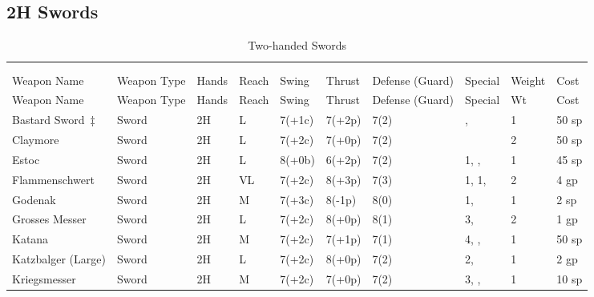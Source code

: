\documentclass[oneside,11pt,english]{book}
\begin{document}
\subsection{2H Swords}\vspace{-15pt}
\begin{longtabu} to 1\linewidth {X[2,l]XX[-1,c]X[-1,c]XXX[-1,c]X[2,l]X[-3,c]X[-3,r]}
	\captionsetup{labelformat=blank,textformat=empty}
	\caption{Two-handed Swords}\vspace{-15pt}\\
	\label{tab:2H Swords}\\
		Weapon Name						&Weapon Type	&Hands&Reach&Swing&Thrust&Defense (Guard)&Special						&Weight	&Cost\\\toprule\endfirsthead
Weapon Name					&Weapon Type	&Hands	&Reach	&Swing	&Thrust	&Defense (Guard)	&Special						&Wt		&Cost\\\toprule\endhead
{Bastard Sword\ \hyperref[wep:bastard-sword-1h]{$ \ddagger $}\label{wep:bastard-sword-2h}}				&Sword			&2H		&L		&7(+1c)	&7(+2p)	&7(2)				&,  			&1		&50 sp\\
Claymore					&Sword			&2H		&L		&7(+2c)	&7(+0p)	&7(2)	& &2 &50 sp\\
Estoc						&Sword 			&2H		&L		&8(+0b)	&6(+2p)	&7(2)	& 1, , 			&1		&45 sp\\
Flammenschwert				&Sword			&2H		&VL		&7(+2c)	&8(+3p)	&7(3)	& 1,  1, 				&2		&4 gp\\
Godenak &Sword &2H &M &7(+3c) &8(-1p) &8(0) & 1,  &1 &2 sp\\
Grosses Messer &Sword &2H &L &7(+2c) &8(+0p) &8(1) & 3,  &2 &1 gp\\
Katana 					&Sword &2H &M 	&7(+2c) &7(+1p) &7(1) & 4, ,  			&1 	&50 sp\\
Katzbalger (Large) 		&Sword &2H &L 	&7(+2c) &8(+0p) &7(2) & 2,  				&1 	&2 gp \\
Kriegsmesser 			&Sword &2H &M 	&7(+2c) &7(+0p) &7(2) & 3, ,  			&1 	&10 sp\\

\end{longtabu}
\end{document}
